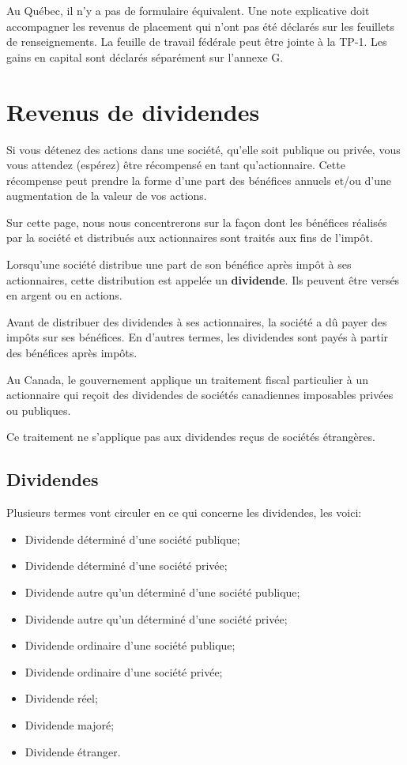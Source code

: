 Au Québec, il n'y a pas de formulaire équivalent. Une note explicative doit accompagner les revenus de placement qui n'ont pas été déclarés sur les feuillets de renseignements. La feuille de travail fédérale peut être jointe à la TP-1. Les gains en capital sont déclarés séparément sur l'annexe G. 



\section{Revenus de dividendes}
\begin{intro}
	Si vous détenez des actions dans une société, qu'elle soit publique ou privée, vous vous attendez (espérez) être récompensé en tant qu'actionnaire. Cette récompense peut prendre la forme d'une part des bénéfices annuels et/ou d'une augmentation de la valeur de vos actions. 
	
	Sur cette page, nous nous concentrerons sur la façon dont les bénéfices réalisés par la société et distribués aux actionnaires sont traités aux fins de l'impôt.
\end{intro}

Lorsqu'une société distribue une part de son bénéfice après impôt à ses actionnaires, cette distribution est appelée un \textbf{dividende}. Ils peuvent être versés en argent ou en actions. 

Avant de distribuer des dividendes à ses actionnaires, la société a dû payer des impôts sur ses bénéfices. En d'autres termes, les dividendes sont payés à partir des bénéfices après impôts. 

Au Canada, le gouvernement applique un traitement fiscal particulier à un actionnaire qui reçoit des dividendes de sociétés canadiennes imposables privées ou publiques. 

Ce traitement ne s'applique pas aux dividendes reçus de sociétés étrangères. 


\subsection{Dividendes}
Plusieurs termes vont circuler en ce qui concerne les dividendes, les voici:
\begin{itemize}[label=]
	\item Dividende déterminé d'une société publique;
	\item Dividende déterminé d'une société privée;
	\item Dividende autre qu'un déterminé d'une société publique;
	\item Dividende autre qu'un déterminé d'une société privée;
	\item Dividende ordinaire d'une société publique;
	\item Dividende ordinaire d'une société privée;
	\item Dividende réel;
	\item Dividende majoré;
	\item Dividende étranger.
\end{itemize}

